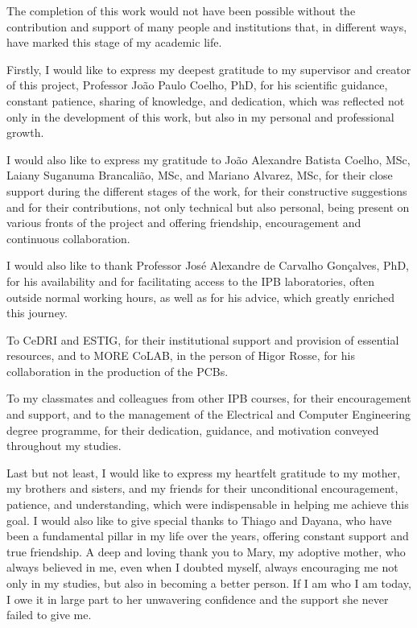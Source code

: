 



The completion of this work would not have been possible without the contribution and support of many
people and institutions that, in different ways, have marked this stage of my academic life.

Firstly, I would like to express my deepest gratitude to my supervisor and creator of this project, Professor João Paulo Coelho, PhD, for his scientific guidance, constant patience, sharing of knowledge, and dedication, which was reflected not only in the development of this work, but also in my personal and professional growth.

I would also like to express my gratitude to João Alexandre Batista Coelho, MSc, Laiany Suganuma Brancalião, MSc, and Mariano Alvarez, MSc, for their close support during the different stages of the work, for their constructive suggestions and for their contributions, not only technical but also personal, being present on various fronts of the project and offering friendship, encouragement and continuous collaboration.

I would also like to thank Professor José Alexandre de Carvalho Gonçalves, PhD, for his availability and for facilitating access to the IPB laboratories, often outside normal working hours, as well as for his advice, which greatly enriched this journey.

To CeDRI and ESTIG, for their institutional support and provision of essential resources, and to MORE CoLAB, in the person of Higor Rosse, for his collaboration in the production of the PCBs.

To my classmates and colleagues from other IPB courses, for their encouragement and support, and to the management of the Electrical and Computer Engineering degree programme, for their dedication, guidance, and motivation conveyed throughout my studies.

Last but not least, I would like to express my heartfelt gratitude to my mother, my brothers and sisters, and my friends for their unconditional encouragement, patience, and understanding, which were indispensable in helping me achieve this goal. I would also like to give special thanks to Thiago and Dayana, who have been a fundamental pillar in my life over the years, offering constant support and true friendship. A deep and loving thank you to Mary, my adoptive mother, who always believed in me, even when I doubted myself, always encouraging me
not only in my studies, but also in becoming a better person. If I am who I am today, I owe it in large part to her unwavering confidence and the support she never failed to give me.